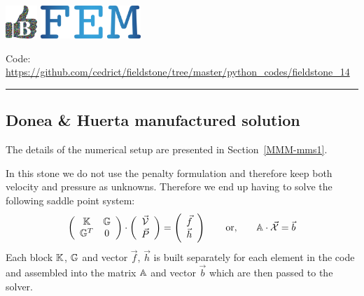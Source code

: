 \includegraphics[height=1.25cm]{images/pictograms/benchmark}
\includegraphics[height=1.25cm]{images/pictograms/FEM}




\begin{center}
\inpython
{\small Code: \url{https://github.com/cedrict/fieldstone/tree/master/python_codes/fieldstone_14}}
\end{center}

\par\noindent\rule{\textwidth}{0.4pt}

\subsection*{Donea \& Huerta manufactured solution}

The details of the numerical setup are presented in Section~\ref{MMM-mms1}.

In this stone we do not use the penalty formulation and therefore 
keep both velocity and pressure as unknowns. Therefore we end up having to solve 
the following saddle point system:
\[
\left(
\begin{array}{cc}
{\mathbb{K}} & {\mathbb{G}} \\ {\mathbb{G}}^T & 0 
\end{array}
\right)
\cdot
\left(
\begin{array}{c}
\vec{\cal V} \\ \vec{P}
\end{array}
\right)
=
\left(
\begin{array}{c}
\vec{f} \\ \vec{h}
\end{array}
\right)
\quad\quad
{\rm or,}
\quad\quad
{\mathbb{A}} \cdot \vec{\cal X} =\vec{b}
\]
Each block ${\mathbb{K}}$, ${\mathbb{G}}$ and vector $\vec{f}$, $\vec{h}$ is built separately for each element 
in the code and assembled into 
the matrix ${\mathbb{A}}$ and vector $\vec{b}$ which are then passed to the solver. 

